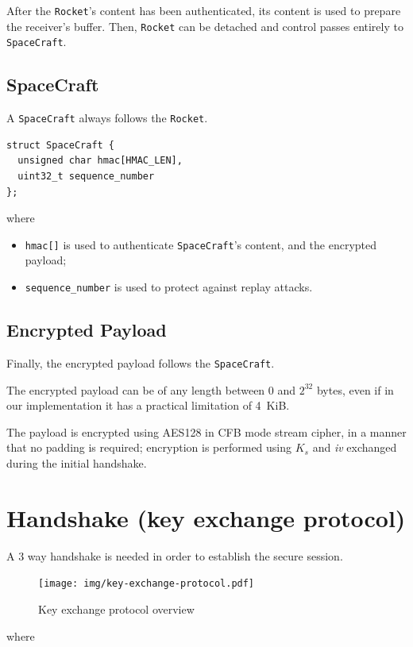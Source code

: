 \documentclass[a4paper,12pt]{article}
\begin{document}
After the \texttt{Rocket}'s content has been authenticated, its content is used to prepare the receiver's buffer.
Then, \texttt{Rocket} can be detached and control passes entirely to \texttt{SpaceCraft}.

\subsection{SpaceCraft}
A \texttt{SpaceCraft} always follows the \texttt{Rocket}.

\begin{verbatim}
struct SpaceCraft {
  unsigned char hmac[HMAC_LEN],
  uint32_t sequence_number
};
\end{verbatim}

where

\begin{itemize}
  \item \texttt{hmac[]} is used to authenticate \texttt{SpaceCraft}'s content, and the encrypted payload;
  \item \texttt{sequence\_number} is used to protect against replay attacks.
\end{itemize}

\subsection{Encrypted Payload}
Finally, the encrypted payload follows the \texttt{SpaceCraft}.

The encrypted payload can be of any length between $0$ and $2^{32}$ bytes, even if in our implementation it has a practical limitation of 4~KiB.

The payload is encrypted using AES128 in CFB mode stream cipher, in a manner that no padding is required;
encryption is performed using $K_s$ and \emph{iv} exchanged during the initial handshake.

\section{Handshake (key exchange protocol)}
A 3 way handshake is needed in order to establish the secure session.

\begin{figure}[H]
\centering
\texttt{[image: img/key-exchange-protocol.pdf]}
\caption{Key exchange protocol overview}
\label{img:key-exchange-protocol}
\end{figure}

where
\end{document}
